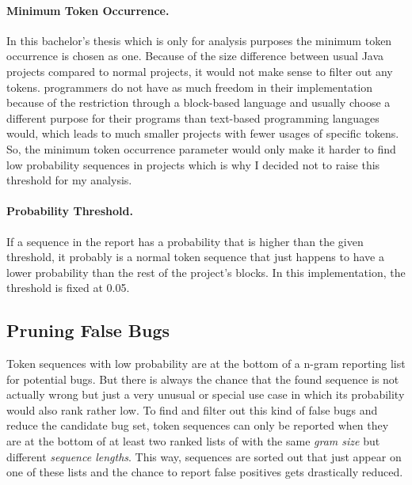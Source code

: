 \paragraph{Minimum Token Occurrence.}
In this bachelor's thesis \ngram{} which is only for \scratch{} analysis purposes the minimum token occurrence is chosen as one. Because of the size difference between usual Java projects compared to normal \scratch{} projects, it would not make sense to filter out any tokens. \scratch{} programmers do not have as much freedom in their implementation because of the restriction through a block-based language and usually choose a different purpose for their programs than text-based programming languages would, which leads to much smaller projects with fewer usages of specific tokens. So, the minimum token occurrence parameter would only make it harder to find low probability sequences in projects which is why I decided not to raise this threshold for my analysis.
\paragraph{Probability Threshold.}
If a sequence in the report has a probability that is higher than the given threshold, it probably is a normal token sequence that just happens to have a lower probability than the rest of the project's blocks. In this implementation, the threshold is fixed at 0.05.

\subsection{Pruning False Bugs}\label{subsec:false_bugs}
Token sequences with low probability are at the bottom of a n-gram reporting list for potential bugs. But there is always the chance that the found sequence is not actually wrong but just a very unusual or special use case in which its probability would also rank rather low. To find and filter out this kind of false bugs and reduce the candidate bug set, token sequences can only be reported when they are at the bottom of at least two ranked lists of  with the same \textit{gram size} but different \textit{sequence lengths}. This way, sequences are sorted out that just appear on one of these lists and the chance to report false positives gets drastically reduced. 